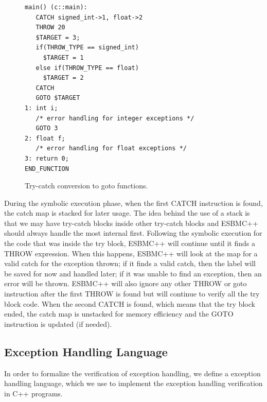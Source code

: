 \documentclass[conference]{IEEEtran}
\begin{document}
{\begin{figure}[ht]
\centering
\begin{minipage}{1.0\textwidth}
\begin{lstlisting}
main() (c::main):
   CATCH signed_int->1, float->2
   THROW 20
   $TARGET = 3;
   if(THROW_TYPE == signed_int)
     $TARGET = 1
   else if(THROW_TYPE == float)
     $TARGET = 2
   CATCH
   GOTO $TARGET
1: int i;
   /* error handling for integer exceptions */
   GOTO 3
2: float f;
   /* error handling for float exceptions */
3: return 0;
END_FUNCTION
\end{lstlisting}
\end{minipage}
\caption{Try-catch conversion to goto functions.}
\label{figure:try-catch-goto}
\end{figure}

During the symbolic execution phase, when the first
CATCH instruction is found, the catch map is stacked
for later usage. The idea behind the use of a stack is
that we may have try-catch blocks inside other
try-catch blocks and ESBMC++ should always handle
the most internal first. Following the symbolic execution
for the code that was inside the try block, ESBMC++ will continue
until it finds a THROW expression. When this happens, ESBMC++ will
look at the map for a valid catch for the exception thrown; if it finds
a valid catch, then the label will be saved for now and handled later;
if it was unable to find an exception, then an error will be thrown.
ESBMC++ will also ignore any other THROW or goto instruction after
the first THROW is found but will continue to verify all the try
block code. When the second CATCH is found, which means that the try
block ended, the catch map is unstacked for memory efficiency
and the GOTO instruction is updated (if needed).

\subsection{Exception Handling Language}

In order to formalize the verification of exception handling, we
define a exception handling language, which we use to implement
the exception handling verification in C++ programs.

}
\end{document}
